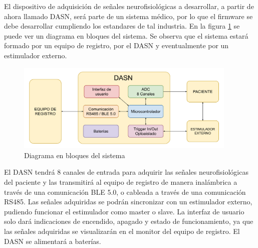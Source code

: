 \documentclass[
11pt, %
codirector, %
]{charter}
\begin{document}
El dispositivo de adquisición de señales neurofisiológicas a desarrollar, a partir de ahora llamado DASN, será parte de un sistema médico, por lo que el firmware se debe desarrollar cumpliendo los estandares de tal industria. En la figura \ref{fig:diagBloquesSistema} se puede ver un diagrama en bloques del sistema. Se observa que el sistema estará formado por un equipo de registro, por el DASN y eventualmente por un estimulador externo. 

\begin{figure}[htpb]
\centering 
\includegraphics[width=0.94\textwidth]{./Figuras/DiagramaEnBloquesDASN.pdf}
\caption{Diagrama en bloques del sistema}
\label{fig:diagBloquesSistema}
\end{figure}

El DASN tendrá 8 canales de entrada para adquirir las señales neurofisiológicas del paciente y las transmitirá al equipo de registro de manera inalámbrica a través de una comunicación BLE 5.0, o cableada a través de una comunicación RS485. Las señales adquiridas se podrán sincronizar con un estimulador externo, pudiendo funcionar el estimulador como master o slave. La interfaz de usuario solo dará indicaciones de encendido, apagado y estado de funcionamiento, ya que las señales adquiridas se visualizarán en el monitor del equipo de registro. El DASN se alimentará a baterías.
\end{document}
